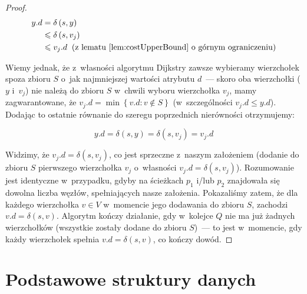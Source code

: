 \begin{proof}
	\begin{equation}
		\begin{aligned}
			y.d &= \delta \left( s, y \right) \\
			&\leqslant \delta \left( s, v_{j} \right) \\
			&\leqslant v_{j}.d \; \; \textrm{(z lematu~\ref{lem:costUpperBound} o~górnym ograniczeniu)}
			\end{aligned}
	\end{equation}
	
	Wiemy jednak, że z~własności algorytmu Dijkstry zawsze wybieramy wierzchołek spoza zbioru $S$ o~jak najmniejszej wartości atrybutu $d$~--- skoro oba wierzchołki ($y$ i~$v_{j}$) nie należą do zbioru $S$ w~chwili wyboru wierzchołka $v_{j}$, mamy zagwarantowane, że $v_{j}.d = \min \left\{ v.d : v \notin S \right\}$ (w~szczególności $v_{j}.d \leqslant y.d$).
	Dodając to ostatnie równanie do szeregu poprzednich nierówności otrzymujemy:
	
	\begin{equation}
		y.d = \delta \left( s, y \right) = \delta \left( s, v_{j} \right) = v_{j}.d
	\end{equation}
	
	Widzimy, że $v_{j}.d = \delta \left( s, v_{j} \right)$, co jest sprzeczne z~naszym założeniem (dodanie do zbioru $S$ pierwszego wierzchołka $v_{j}$ o~własności  $v_{j}.d = \delta \left( s, v_{j} \right) $).
	Rozumowanie jest identyczne w~przypadku, gdyby na ścieżkach $p_{1}$ i/lub $p_{2}$ znajdowała się dowolna liczba węzłów, spełniających nasze założenia.
	Pokazaliśmy zatem, że dla każdego wierzchołka $v \in V$ w~momencie jego dodawania do zbioru $S$, zachodzi $v.d = \delta \left( s, v \right)$.
	Algorytm kończy działanie, gdy w~kolejce $Q$ nie ma już żadnych wierzchołków (wszystkie zostały dodane do zbioru $S$)~--- to jest w~momencie, gdy każdy wierzchołek spełnia $v.d = \delta \left( s, v \right)$, co kończy dowód.
\end{proof}




\section{Podstawowe struktury danych}




